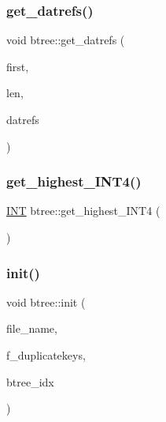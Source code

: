 \mbox{\label{classbtree_a4f8c801758d3fdb0e12cfa8be1bcdd74}} 
\subsubsection{\texorpdfstring{get\+\_\+datrefs()}{get\_datrefs()}}
{\footnotesize\ttfamily void btree\+::get\+\_\+datrefs (\begin{DoxyParamCaption}\item[{\mbox{\hyperlink{galois_8h_a09fddde158a3a20bd2dcadb609de11dc}{I\+NT}}}]{first,  }\item[{\mbox{\hyperlink{galois_8h_a09fddde158a3a20bd2dcadb609de11dc}{I\+NT}}}]{len,  }\item[{\mbox{\hyperlink{class_vector}{Vector}} \&}]{datrefs }\end{DoxyParamCaption})}

\mbox{\label{classbtree_a699ad5c8c9d1d516693954e5178be309}} 
\subsubsection{\texorpdfstring{get\+\_\+highest\+\_\+\+I\+N\+T4()}{get\_highest\_INT4()}}
{\footnotesize\ttfamily \mbox{\hyperlink{galois_8h_a09fddde158a3a20bd2dcadb609de11dc}{I\+NT}} btree\+::get\+\_\+highest\+\_\+\+I\+N\+T4 (\begin{DoxyParamCaption}{ }\end{DoxyParamCaption})}

\mbox{\label{classbtree_a3c88706e9886f1f9bc142b511aeab642}} 
\subsubsection{\texorpdfstring{init()}{init()}}
{\footnotesize\ttfamily void btree\+::init (\begin{DoxyParamCaption}\item[{const \mbox{\hyperlink{galois_8h_ab6cc7b4aeb6ea31aba2b3fbfc83ff5e6}{B\+Y\+TE}} $\ast$}]{file\+\_\+name,  }\item[{\mbox{\hyperlink{galois_8h_a09fddde158a3a20bd2dcadb609de11dc}{I\+NT}}}]{f\+\_\+duplicatekeys,  }\item[{\mbox{\hyperlink{galois_8h_a09fddde158a3a20bd2dcadb609de11dc}{I\+NT}}}]{btree\+\_\+idx }\end{DoxyParamCaption})}

